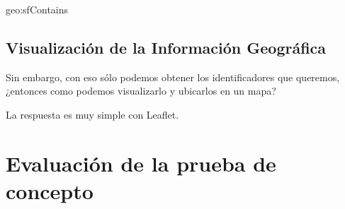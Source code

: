 geo:sfContains



\subsection{Visualización de la Información Geográfica}


Sin embargo, con eso sólo podemos obtener los identificadores que queremos, ¿entonces como podemos visualizarlo y ubicarlos en un mapa?

La respuesta es muy simple con Leaflet.



\section{Evaluación de la prueba de concepto}





\newpage










\newpage






